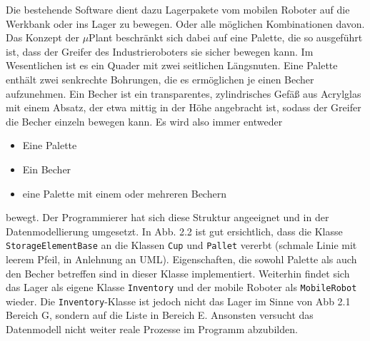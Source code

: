     Die bestehende Software dient dazu Lagerpakete vom mobilen Roboter auf die Werkbank oder ins Lager zu bewegen.
    Oder alle möglichen Kombinationen davon.
    Das Konzept der $\mu$Plant beschränkt sich dabei auf eine Palette, die so ausgeführt ist, dass der Greifer des
    Industrieroboters sie sicher bewegen kann.
    Im Wesentlichen ist es ein Quader mit zwei seitlichen Längsnuten.
    Eine Palette enthält zwei senkrechte Bohrungen, die es ermöglichen je einen Becher aufzunehmen.
    Ein Becher ist ein transparentes, zylindrisches Gefäß aus Acrylglas mit einem Absatz, der etwa mittig in der
    Höhe angebracht ist, sodass der Greifer die Becher einzeln bewegen kann.
    Es wird also immer entweder
    \begin{itemize}
        \item Eine Palette
        \item Ein Becher
        \item eine Palette mit einem oder mehreren Bechern
    \end{itemize}
    bewegt.
    Der Programmierer hat sich diese Struktur angeeignet und in der Datenmodellierung umgesetzt.
    In Abb. 2.2 ist gut ersichtlich, dass die Klasse \verb|StorageElementBase| an die Klassen \verb|Cup| und \verb|Pallet|
    vererbt (schmale Linie mit leerem Pfeil, in Anlehnung an UML). Eigenschaften, die sowohl Palette als auch den
    Becher betreffen sind in dieser Klasse implementiert.
    Weiterhin findet sich das Lager als eigene Klasse \verb|Inventory| und der mobile Roboter als \verb|MobileRobot| wieder.
    Die \verb|Inventory|-Klasse ist jedoch nicht das Lager im Sinne von Abb 2.1 Bereich \glqq G\grqq, sondern auf die Liste in
    Bereich \glqq E\grqq.
    Ansonsten versucht das Datenmodell nicht weiter reale Prozesse im Programm abzubilden.
    \\

